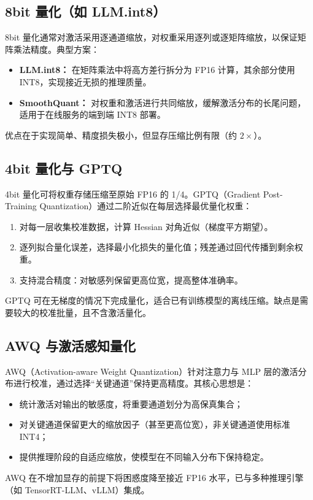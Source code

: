 \documentclass[UTF8,zihao=-4]{ctexart}
\begin{document}
\subsection{8bit 量化（如 LLM.int8）}
8bit 量化通常对激活采用逐通道缩放，对权重采用逐列或逐矩阵缩放，以保证矩阵乘法精度。典型方案：
\begin{itemize}
  \item \textbf{LLM.int8：} 在矩阵乘法中将高方差行拆分为 FP16 计算，其余部分使用 INT8，实现接近无损的推理质量。
  \item \textbf{SmoothQuant：} 对权重和激活进行共同缩放，缓解激活分布的长尾问题，适用于在线服务的端到端 INT8 部署。
\end{itemize}
优点在于实现简单、精度损失极小，但显存压缩比例有限（约 $2\times$）。

\subsection{4bit 量化与 GPTQ}
4bit 量化可将权重存储压缩至原始 FP16 的 1/4。GPTQ（Gradient Post-Training Quantization）通过二阶近似在每层选择最优量化权重：
\begin{enumerate}
  \item 对每一层收集校准数据，计算 Hessian 对角近似（梯度平方期望）。
  \item 逐列拟合量化误差，选择最小化损失的量化值；残差通过回代传播到剩余权重。
  \item 支持混合精度：对敏感列保留更高位宽，提高整体准确率。
\end{enumerate}
GPTQ 可在无梯度的情况下完成量化，适合已有训练模型的离线压缩。缺点是需要较大的校准批量，且不含激活量化。

\subsection{AWQ 与激活感知量化}
AWQ（Activation-aware Weight Quantization）针对注意力与 MLP 层的激活分布进行校准，通过选择“关键通道”保持更高精度。其核心思想是：
\begin{itemize}
  \item 统计激活对输出的敏感度，将重要通道划分为高保真集合；
  \item 对关键通道保留更大的缩放因子（甚至更高位宽），非关键通道使用标准 INT4；
  \item 提供推理阶段的自适应缩放，使模型在不同输入分布下保持稳定。
\end{itemize}
AWQ 在不增加显存的前提下将困惑度降至接近 FP16 水平，已与多种推理引擎（如 TensorRT-LLM、vLLM）集成。
\end{document}
